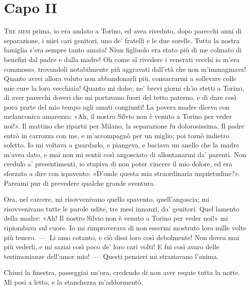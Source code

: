
\chapter{Capo II}

\lettrine{T}{re mesi} prima, io era andato a Torino, ed avea riveduto, dopo parecchi
anni di separazione, i miei cari genitori, uno de' fratelli e le due
sorelle. Tutta la nostra famiglia s'era sempre tanto amata! Niun figliuolo
era stato più di me colmato di benefizi dal padre e dalla madre! Oh come al
rivedere i venerati vecchi io m'era commosso, trovandoli notabilmente più
aggravati dall'età che non m'immaginava! Quanto avrei allora voluto non
abbandonarli più, consacrarmi a sollevare colle mie cure la loro vecchiaia!
Quanto mi dolse, ne' brevi giorni ch'io stetti a Torino, di aver parecchi
doveri che mi portavano fuori del tetto paterno, e di dare così poca parte
del mio tempo agli amati congiunti! La povera madre diceva con melanconica
amarezza: «Ah, il nostro Silvio non è venuto a Torino per veder noi!». Il
mattino che ripartii per Milano, la separazione fu dolorosissima. Il padre
entrò in carrozza con me, e m'accompagnò per un miglio; poi tornò indietro
soletto. Io mi voltava a guardarlo, e piangeva, e baciava un anello che la
madre m'avea dato, e mai non mi sentii così angosciato di allontanarmi
da' parenti. Non credulo a' presentimenti, io stupiva di non poter vincere il
mio dolore, ed era sforzato a dire con ispavento: «D'onde questa mia
straordinaria inquietudine?». Pareami pur di prevedere qualche grande
sventura.

Ora, nel carcere, mi risovvenivano quello spavento, quell'angoscia; mi
risovvenivano tutte le parole udite, tre mesi innanzi, da' genitori. Quel
lamento della madre: «Ah! Il nostro Silvio non è venuto a Torino per veder
noi!» mi ripiombava sul cuore. Io mi rimproverava di non essermi mostrato
loro mille volte più tenero.~---~Li amo cotanto, e ciò dissi loro così
debolmente! Non dovea mai più vederli, e mi saziai così poco de' loro cari
volti! E fui così avaro delle testimonianze dell'amor mio!~---~Questi
pensieri mi straziavano l'anima.

Chiusi la finestra, passeggiai un'ora, credendo di non aver requie tutta la
notte. Mi posi a letto, e la stanchezza m'addormentò.
